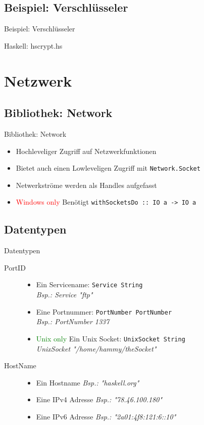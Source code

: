 \documentclass{beamer}
\newcommand{\code}[2]
{
	\begin{block}{#1: #2}
	
	\end{block}
}
\begin{document}
\subsection{Beispiel: Verschl\"usseler}
\begin{frame}{Beispiel: Verschl\"usseler}
\tiny
\code{Haskell}{hscrypt.hs}
\end{frame}

\section{Netzwerk}
\subsection{Bibliothek: Network}
\begin{frame}{Bibliothek: Network}
\begin{itemize}
\item Hochleveliger Zugriff auf Netzwerkfunktionen
\item Bietet auch einen Lowleveligen Zugriff mit \texttt{Network.Socket}
\item Netwerkströme werden als Handles aufgefasst
\item \textcolor{red}{Windows only} Benötigt \texttt{withSocketsDo :: IO a -> IO a}
\end{itemize}
\end{frame}

\subsection{Datentypen}
\begin{frame}{Datentypen}
\begin{description}
\item[PortID] \begin{itemize}
\item Ein Servicename: \texttt{Service String} \\ \textit{Bsp.: Service "ftp"}
\item Eine Portnummer: \texttt{PortNumber PortNumber} \\ \textit{Bsp.: PortNumber 1337}
\item \textcolor{green}{Unix only} Ein Unix Socket: \texttt{UnixSocket String} \\ \textit{UnixSocket "/home/hammy/theSocket"}
\end{itemize}
\item[HostName]
\begin{itemize}
\item Ein Hostname \textit{Bsp.: "haskell.org"}
\item Eine IPv4 Adresse \textit{Bsp.: "78.46.100.180"}
\item Eine IPv6 Adresse \textit{Bsp.: "2a01:4f8:121:6::10"}
\end{itemize}
\end{description}
\end{frame}
\end{document}
